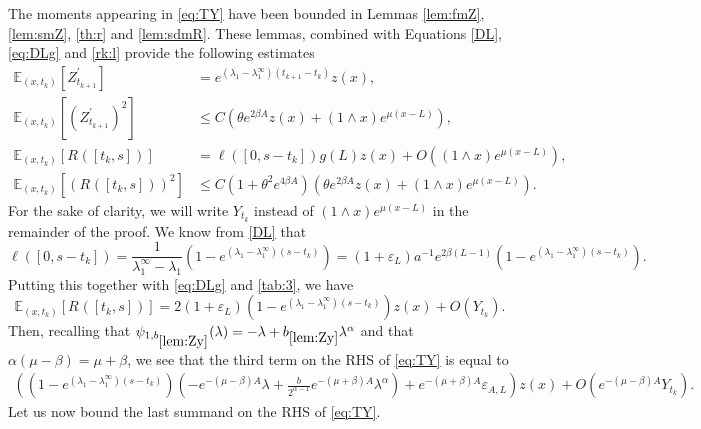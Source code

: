 \documentclass[11pt]{article}
\theoremstyle{plain}
\newcommand\linf{\lambda_1^\infty}
\newcommand\vep{\varepsilon}
\begin{document}
The moments appearing in \eqref{eq:TY} have been bounded in Lemmas \ref{lem:fmZ}, \ref{lem:smZ}, \ref{th:r} and \ref{lem:sdmR}. These lemmas, combined with Equations \eqref{DL}, \eqref{eq:DLg} and \eqref{rk:l} provide the following estimates
\begin{align}
\mathbb{E}_{(x,t_k)}\left[Z_{t_{k+1}}^{'}\right]&=e^{(\lambda_1-\linf)(t_{k+1}-t_k)}z(x),\label{tab:1}\\
\mathbb{E}_{(x,t_k)}\left[\left(Z_{t_{k+1}}^{'}\right)^2\right]&\leqslant C\left(\theta e^{2\beta A} z(x)+(1\wedge x)e^{\mu(x-L)}\right)\label{tab:2},\\
\mathbb{E}_{(x,t_k)}\left[R^{}([t_k,s])\right]&=\ell([0,s-t_k])g(L)z(x)+O\left((1\wedge x)e^{\mu(x-L)}\right),\label{tab:3}\\
\mathbb{E}_{(x,t_k)}\left[\left(R^{}([t_k,s])\right)^2\right]&\leqslant C(1+\theta^2e^{4\beta A})\left(\theta e^{2\beta A} z(x)+(1\wedge x)e^{\mu(x-L)}\right)\label{tab:4}.
\end{align}
For the sake of clarity, we will write $Y_{t_k}$ instead of $(1\wedge x)e^{\mu(x-L)}$ in the remainder of the proof.
We know from \eqref{DL} that
\begin{equation*}
\ell([0,s-t_k])=\frac{1}{\linf-\lambda_1}\left(1-e^{(\lambda_1-\linf)(s-t_k)}\right)=(1+\vep_L)a^{-1}e^{2\beta(L-1)}\left(1-e^{(\lambda_1-\linf)(s-t_k)}\right).
\end{equation*} Putting this together with \eqref{eq:DLg} and \eqref{tab:3}, we have 
\begin{equation*}
\mathbb{E}_{(x,t_k)}\left[R^{}([t_k,s])\right]=2(1+\vep_L)\left(1-e^{(\lambda_1-\linf)(s-t_k)}\right) z(x)+O\left(Y_{t_k}\right).
\end{equation*}
Then, recalling that $\psi_{1,b_{\ref{lem:Zy}}}(\lambda)=-\lambda+b_{\ref{lem:Zy}}\lambda^\alpha$ and that $\alpha(\mu-\beta)=\mu+\beta$, we see that the third term on the RHS of \eqref{eq:TY} is equal to  
\begin{align}
\left(\left(1-e^{(\lambda_1-\linf)(s-t_k)}\right)\left( -e^{-(\mu-\beta)A} \lambda+\frac{b}{2^{\alpha-1}}e^{-(\mu+\beta)A}\lambda^\alpha\right)+e^{-({\mu+\beta})A}\vep_{A,L}\right)z(x)+O\left(e^{-(\mu-\beta)A}Y_{t_k}\right).\label{eq:t:1}
\end{align} 
Let us now bound the last summand on the RHS of \eqref{eq:TY}. 
\end{document}
